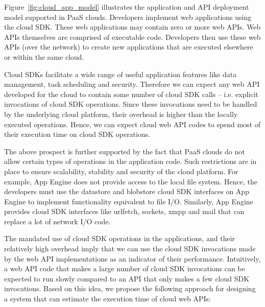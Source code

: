Figure~\ref{fig:cloud_app_model} illustrates the application and API deployment model supported in PaaS clouds.
Developers implement web applications using the cloud SDK. These web applications may contain zero or more
web APIs. Web APIs themselves are comprised of executable code. 
Developers then use these web APIs (over the network) to create new applications that are executed elsewhere or within the
same cloud.

Cloud SDKs facilitate a wide range of useful application features like data management, 
task scheduling and security. Therefore we can expect any web API developed for the cloud to
contain some number of cloud SDK calls -- i.e.
explicit invocations of cloud SDK operations. Since these invocations need to be handled by the
underlying cloud platform, their overhead is higher than the locally executed operations.
Hence, we can expect cloud web API codes to spend most of their execution time on cloud SDK operations. 

The above prospect is further supported by the fact that PaaS clouds do not allow 
certain types of operations in the application code. Such restrictions are in place
to ensure scalability, stability and security of the cloud platform. For example, App Engine
does not provide access to the local file system. %
Hence, the developers must use the datastore and blobstore cloud SDK interfaces on App
Engine to implement functionality equivalent to file I/O. Similarly, App Engine provides cloud SDK
interfaces like urlfetch, sockets, xmpp and mail that can replace a lot of network I/O code.

The mandated use of cloud SDK operations in the applications, and their relatively high overhead 
imply that we can use the cloud SDK
invocations made by the web API implementations as an indicator of their performance. Intuitively, a web API
code that makes a large number of cloud SDK invocations can be expected to run slowly compared
to an API that only makes a few cloud SDK invocations. Based on this idea, we propose the following approach
for designing a system that can estimate the execution time of cloud web APIs:

